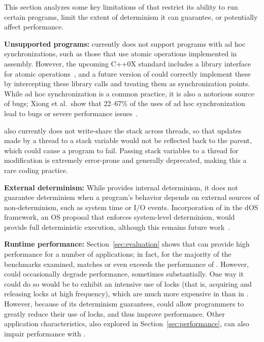 \label{sec:discussion}

This section analyzes some key limitations of \dthreads{} that
restrict its ability to run certain programs, limit the extent of
determinism it can guarantee, or potentially affect performance.


\textbf{Unsupported programs: }
\dthreads{} currently does not support programs with ad hoc
synchronizations, such as those that use atomic operations implemented in assembly.  However, the upcoming C++0X standard includes a library interface for atomic operations~\cite[pp. 1107--1128]{c++0xstandarddraft}, and a future version of \dthreads{} could correctly implement these by intercepting
these library calls and treating them as synchronization points. While
ad hoc synchronization is a common practice, it is also a notorious
source of bugs; Xiong et al.\ show that 22--67\% of the uses of ad hoc
synchronization lead to bugs or severe performance issues~\cite{ad-hoc-considered-harmful}.

\dthreads{} also currently does not write-share the stack
across threads, so that updates made by a thread to a stack variable
would not be reflected back to the parent, which could cause a program
to fail. Passing stack variables to a thread for modification is
extremely error-prone and generally deprecated, making this a rare
coding practice.

\textbf{External determinism: }
While \dthreads{} provides internal determinism, it does not
guarantee determinism when a program's behavior depends on external
sources of non-determinism, such as system time or I/O
events. Incorporation of \dthreads{} in the dOS framework, an OS
proposal that enforces system-level determinism, would provide full
deterministic execution, although this remains future
work~\cite{deterministic-process-groups}.

\textbf{Runtime performance: }
Section~\ref{sec:evaluation} shows that \dthreads{} can provide high
performance for a number of applications; in fact, for the majority of
the benchmarks examined, \dthreads{} matches or even exceeds the
performance of \pthreads{}. However, \dthreads{} could occasionally
degrade performance, sometimes substantially. One way it could do so
would be to exhibit an intensive use of locks (that is, acquiring and
releasing locks at high frequency), which are much more expensive
in \dthreads{} than in \pthreads{}. However, because of its determinism guarantees, \dthreads{} could allow programmers to greatly reduce their use of locks, and thus improve performance. Other application characteristics, also explored in Section~\ref{sec:performance}, can also impair performance
with \dthreads{}.


